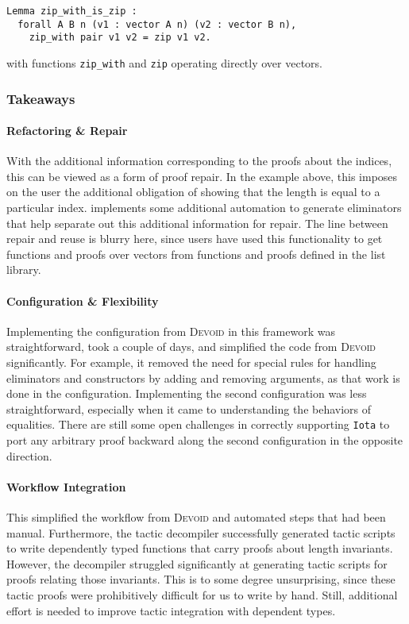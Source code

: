 \begin{lstlisting}
Lemma zip_with_is_zip :
  forall A B n (v1 : vector A n) (v2 : vector B n),
    zip_with pair v1 v2 = zip v1 v2.
\end{lstlisting}
with functions \lstinline{zip_with} and \lstinline{zip} operating directly over vectors.

\subsubsection{Takeaways}

\paragraph{Refactoring \& Repair}
With the additional information corresponding to the proofs about the indices, this can be viewed
as a form of proof repair. In the example above, this imposes on the user the additional
obligation of showing that the length is equal to a particular index.
\toolname implements some additional automation to generate eliminators that help separate out this additional information
for repair. The line between repair and reuse is blurry here, since users have used this
functionality to get functions and proofs over vectors from functions and proofs defined in the list library.

\paragraph{Configuration \& Flexibility}
Implementing the configuration from \textsc{Devoid} in this framework was straightforward,
took a couple of days, and simplified the code from \textsc{Devoid} significantly.
For example, it removed the need for special rules for handling eliminators and constructors
by adding and removing arguments,
as that work is done in the configuration.
Implementing the second configuration was less straightforward,
especially when it came to understanding the behaviors of equalities.
There are still some open challenges in correctly supporting \lstinline{Iota} to port any arbitrary
proof backward along the second configuration in the opposite direction.

\paragraph{Workflow Integration}
This simplified the workflow from \textsc{Devoid} and automated steps that had been manual.
Furthermore, the tactic decompiler successfully generated tactic scripts to write dependently typed
functions that carry proofs about length invariants.
However, the decompiler struggled significantly at generating tactic scripts for proofs relating those invariants.
This is to some degree unsurprising, since these tactic proofs
were prohibitively difficult for us to write by hand.
Still, additional effort is needed to improve tactic integration with dependent types.

